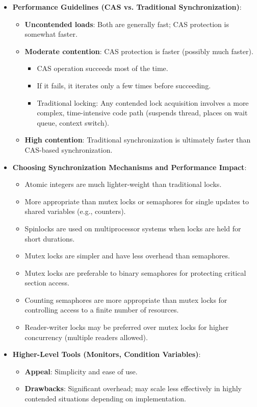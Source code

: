 \begin{itemize}
    \item \textbf{Performance Guidelines (CAS vs. Traditional Synchronization)}:
    \begin{itemize}
        \item \textbf{Uncontended loads}: Both are generally fast; CAS protection is somewhat faster.
        \item \textbf{Moderate contention}: CAS protection is faster (possibly much faster).
        \begin{itemize}
            \item CAS operation succeeds most of the time.
            \item If it fails, it iterates only a few times before succeeding.
            \item Traditional locking: Any contended lock acquisition involves a more complex, time-intensive code path (suspends thread, places on wait queue, context switch).
        \end{itemize}
        \item \textbf{High contention}: Traditional synchronization is ultimately faster than CAS-based synchronization.
    \end{itemize}

    \item \textbf{Choosing Synchronization Mechanisms and Performance Impact}:
    \begin{itemize}
        \item Atomic integers are much lighter-weight than traditional locks.
        \item More appropriate than mutex locks or semaphores for single updates to shared variables (e.g., counters).
        \item Spinlocks are used on multiprocessor systems when locks are held for short durations.
        \item Mutex locks are simpler and have less overhead than semaphores.
        \item Mutex locks are preferable to binary semaphores for protecting critical section access.
        \item Counting semaphores are more appropriate than mutex locks for controlling access to a finite number of resources.
        \item Reader-writer locks may be preferred over mutex locks for higher concurrency (multiple readers allowed).
    \end{itemize}

    \item \textbf{Higher-Level Tools (Monitors, Condition Variables)}:
    \begin{itemize}
        \item \textbf{Appeal}: Simplicity and ease of use.
        \item \textbf{Drawbacks}: Significant overhead; may scale less effectively in highly contended situations depending on implementation.
    \end{itemize}


\end{itemize}

